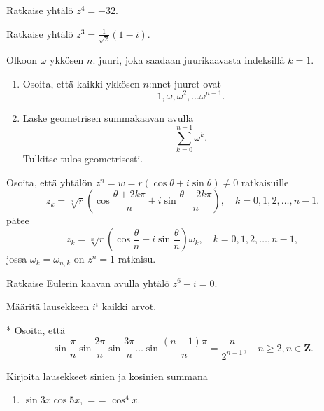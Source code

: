 \documentclass[a4paper, 12pt]{article}
\makeatletter
\theoremstyle{remark}
\theoremstyle{definition}
\newcommand{\inlineitem}[1][]{%
\ifnum\enit@type=\tw@
    {\descriptionlabel{#1}}
  \hspace{\labelsep}%
\else
  \ifnum\enit@type=\z@
       \refstepcounter{\@listctr}\fi
    \quad\@itemlabel\hspace{\labelsep}%
\fi}
\newenvironment{listaa} %
    {\begin{enumerate}[leftmargin=*, label=\alph*), topsep=0pt, itemsep=0pt, parsep=0pt, font=\small\bfseries\color{red}] \itemsep0pt \parskip0pt \parsep0pt \topsep0pt}
    {\end{enumerate}}
\makeatother
\begin{document}
\begin{teht}
Ratkaise yhtälö $z^4=-32.$
\end{teht}

\begin{teht}
Ratkaise yhtälö $z^3=\frac{1}{\sqrt{2}}(1-i).$
\end{teht}

\begin{teht} Olkoon $\omega$ ykkösen $n.$ juuri, joka saadaan juurikaavasta indeksillä $k=1.$
\begin{listaa}
\item Osoita, että kaikki ykkösen $n$:nnet juuret ovat 
$$
1, \omega, \omega^2,\ldots \omega^{n-1}.
$$
\item Laske geometrisen summakaavan avulla
$$
\sum_{k=0}^{n-1} \omega^k.
$$
Tulkitse tulos geometrisesti.
\end{listaa}

\end{teht}

\begin{teht}
Osoita, että yhtälön $z^n=w=r(\cos\theta+i\sin\theta)\neq 0$ ratkaisuille
$$
z_k=\sqrt[n]{r}\left(\cos \frac{\theta+2k\pi}{n}+i\sin \frac{\theta+2k\pi}{n}\right),\quad k=0,1,2,\ldots, n-1.
$$
pätee
$$
z_k=\sqrt[n]{r}\left(\cos \frac{\theta}{n}+i\sin \frac{\theta}{n}\right)\omega_k,\quad k=0,1,2,\ldots, n-1,
$$
jossa $\omega_k=\omega_{n, k}$ on $z^n=1$ ratkaisu.
\end{teht}

\begin{teht}
Ratkaise Eulerin kaavan avulla yhtälö $z^6-i=0.$
\end{teht}
\begin{teht}
Määritä lausekkeen $i^i$ kaikki arvot.
\end{teht}
\begin{teht}{*}
Osoita, että
$$
\sin\frac{\pi}{n}\sin\frac{2\pi}{n}\sin\frac{3\pi}{n}\ldots \sin\frac{(n-1)\pi}{n}=\frac{n}{2^{n-1}},\quad n\geq 2, n\in\mathbf{Z}.
$$
\end{teht}

\begin{teht} Kirjoita lausekkeet sinien ja kosinien summana
\begin{enumerate}[label=\alph*), topsep=0pt, itemsep=0pt, parsep=0pt, leftmargin=*]
    \item $\sin 3x \cos 5x,$
    \inlineitem $\cos^4 x.$
\end{enumerate}

\end{teht}
\end{document}
